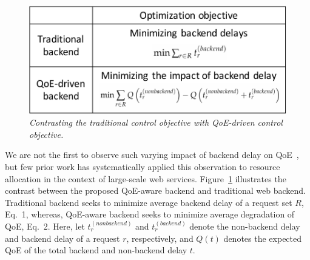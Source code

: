 \begin{figure}
	\centering
	\vspace{-0.5cm}
	\includegraphics[width=1.0\textwidth]{figs/objective-contrast.pdf}
	\caption{\em Contrasting the traditional control objective with QoE-driven control objective.}
	\label{fig:objective-contrast}
\end{figure}
We are not the first to observe such varying impact of backend delay on QoE~\cite{timecard,dqbarge,balachandran2014modeling}, but few prior work has systematically applied this observation to resource allocation in the context of large-scale web services. 
Figure~\ref{fig:objective-contrast} illustrates the contrast between the proposed QoE-aware backend and traditional web backend.
Traditional backend seeks to minimize average backend delay of a request set $R$, \ie Eq.~1,
whereas, QoE-aware backend seeks to minimize average degradation of QoE, \ie Eq.~2.
Here, let $t_{r}^{(nonbackend)}$ and $t_{r}^{(backend)}$ denote the non-backend delay and backend delay of a request $r$, respectively, and $Q(t)$ denotes the expected QoE of the total backend and non-backend delay $t$.

